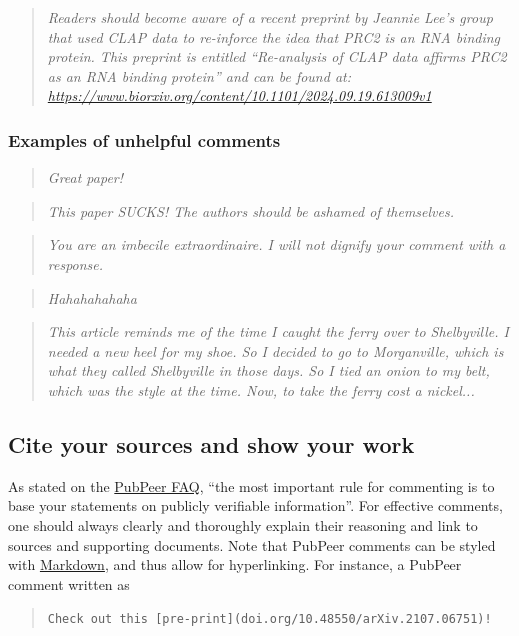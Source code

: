 \documentclass[letterpaper, 12pt]{article}
\begin{document}
\begin{quote}
\textit{Readers should become aware of a recent preprint by Jeannie Lee's group that used CLAP data to re-inforce the idea that PRC2 is an RNA binding protein. This preprint is entitled ``Re-analysis of CLAP data affirms PRC2 as an RNA binding protein'' and can be found at: \href{https://www.biorxiv.org/content/10.1101/2024.09.19.613009v1}{https://www.biorxiv.org/content/10.1101/2024.09.19.613009v1}}
\end{quote}

\subsubsection*{Examples of unhelpful comments}

\begin{quote}
    \textit{Great paper!}
\end{quote}

\begin{quote}
    \textit{This paper SUCKS! The authors should be ashamed of themselves.}
\end{quote}

\begin{quote}
    \textit{You are an imbecile extraordinaire. I will not dignify your comment with a response.}
\end{quote}

\begin{quote}
    \textit{Hahahahahaha}
\end{quote}

\begin{quote}
    \textit{This article reminds me of the time I caught the ferry over to Shelbyville. I needed a new heel for my shoe. So I decided to go to Morganville, which is what they called Shelbyville in those days. So I tied an onion to my belt, which was the style at the time. Now, to take the ferry cost a nickel...}
\end{quote}

\subsection*{Cite your sources and show your work}

As stated on the \href{https://pubpeer.com/static/faq#4}{PubPeer FAQ}, ``the most important rule for commenting is to base your statements on publicly verifiable information''. For effective comments, one should always clearly and thoroughly explain their reasoning and link to sources and supporting documents. Note that PubPeer comments can be styled with \href{https://pubpeer.com/static/markdown}{Markdown}, and thus allow for hyperlinking. For instance, a PubPeer comment written as
\begin{quote}
    \verb|Check out this [pre-print](doi.org/10.48550/arXiv.2107.06751)!|
\end{quote}
\end{document}

